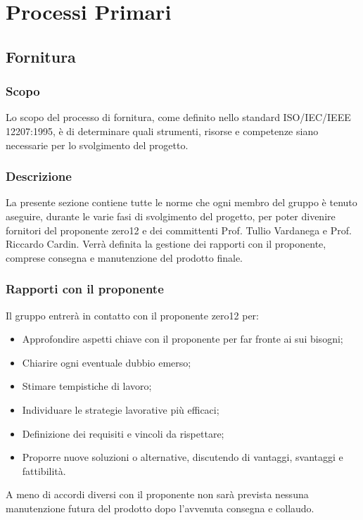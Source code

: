 \section{Processi Primari}
\subsection{Fornitura}
\subsubsection{Scopo}
Lo scopo del processo di fornitura, come definito nello standard ISO/IEC/IEEE 12207:1995, è di determinare quali strumenti, risorse e competenze siano necessarie per lo svolgimento del progetto. 

\subsubsection{Descrizione}
La presente sezione contiene tutte le norme che ogni membro del gruppo è tenuto aseguire, durante le varie fasi di svolgimento del progetto, per poter divenire fornitori del proponente zero12 e dei committenti Prof. Tullio Vardanega e Prof. Riccardo Cardin. 
Verrà definita la gestione dei rapporti con il proponente, comprese consegna e manutenzione del prodotto finale.

\subsubsection{Rapporti con il proponente}
Il gruppo entrerà in contatto con il proponente zero12 per:
\begin{itemize}
	\item Approfondire aspetti chiave con il proponente per far fronte ai sui bisogni; 
	\item Chiarire ogni eventuale dubbio emerso;
	\item Stimare tempistiche di lavoro;
	\item Individuare le strategie lavorative più efficaci;
	\item Definizione dei requisiti e vincoli da rispettare;
	\item Proporre nuove soluzioni o alternative, discutendo di vantaggi, svantaggi e fattibilità.
\end{itemize}
A meno di accordi diversi con il proponente non sarà prevista nessuna manutenzione futura del prodotto dopo l'avvenuta consegna e collaudo.


